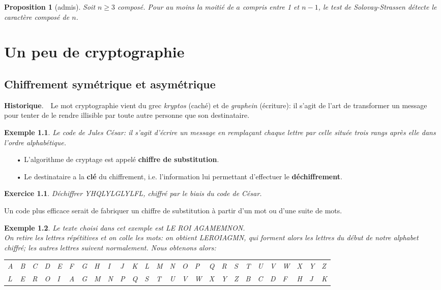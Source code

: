\documentclass[12pt]{report}
\newtheorem*{ex}{Exemple}
\newtheorem*{exo}{Exercice}
\newtheorem{Prop}[thm]{Proposition}
\begin{document}
\begin{Prop}[admis]
Soit $n \geq 3$ composé. Pour au moins la moitié de $a$ compris entre 1 et $n-1$, le test de Solovay-Strassen détecte le caractère composé de $n$.
\end{Prop}

\chapter{Un peu de cryptographie}


\section{Chiffrement symétrique et asymétrique}


{\textbf{Historique}}.\ \ Le mot cryptographie vient du grec \textit{kryptos} (caché) et de \textit{graphein} (écriture): il s'agit de l'art de transformer un message pour tenter de le rendre illisible par toute autre personne que son destinataire.

\begin{ex}
Le code de Jules César: il s'agit d'écrire un message en remplaçant chaque lettre par celle située trois rangs après elle dans l'ordre alphabétique.
\end{ex}

\begin{itemize}
\item[•] L'algorithme de cryptage est appelé \textbf{chiffre de substitution}.
\item[•] Le destinataire a la \textbf{clé} du chiffrement, i.e. l'information lui permettant d'effectuer le \textbf{déchiffrement}.
\end{itemize}


\begin{exo}
Déchiffrer YHQLYLGLYLFL, chiffré par le biais du code de César.
\end{exo}

Un code plus efficace serait de fabriquer un chiffre de substitution à partir d'un mot ou d'une suite de mots.

\begin{ex}
Le texte choisi dans cet exemple est LE ROI AGAMEMNON.\\
On retire les lettres répétitives et on colle les mots: on obtient LEROIAGMN, qui forment alors les lettres du début de notre alphabet chiffré; les autres lettres suivent normalement. Nous obtenons alors:
  
\begin{tabular}{p{0.1cm}p{0.1cm}p{0.1cm}p{0.1cm}p{0.1cm}p{0.1cm}p{0.1cm}p{0.1cm}p{0.1cm}p{0.1cm}p{0.1cm}p{0.1cm}p{0.1cm}p{0.1cm}p{0.1cm}p{0.1cm}p{0.1cm}p{0.1cm}p{0.1cm}p{0.1cm}p{0.1cm}p{0.1cm}p{0.1cm}p{0.1cm}p{0.1cm}p{0.1cm}}
 A & B & C & D & E & F & G & H & I & J & K & L & M & N &O &P & Q & R & S & T & U & V & W & X & Y & Z   \\
L & E & R & O & I & A & G & M & N & P & Q  & S & T & U & V & W & X & Y & Z & B & C & D & F & H & J & K 
\end{tabular}\\  
\end{ex}
 
\end{document}
